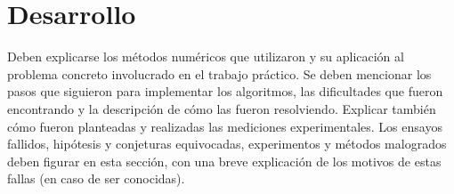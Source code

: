 \documentclass[a4paper]{article}
\begin{document}
\newpage
\section{Desarrollo}
Deben explicarse los m\'etodos num\'ericos que utilizaron y su aplicaci\'on al problema
concreto involucrado en el trabajo pr\'actico. Se deben mencionar los pasos que siguieron
para implementar los algoritmos, las dificultades que fueron encontrando y la
descripci\'on de c\'omo las fueron resolviendo. Explicar tambi\'en c\'omo fueron planteadas
y realizadas las mediciones experimentales. Los ensayos fallidos, hip\'otesis y conjeturas
equivocadas, experimentos y m\'etodos malogrados deben figurar en esta secci\'on, con
una breve explicaci\'on de los motivos de estas fallas (en caso de ser conocidas).\\
\\
\end{document}
